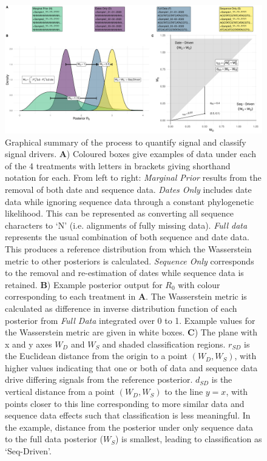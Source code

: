 \documentclass{article}
\begin{document}
\begin{figure}[H]
\centering
\includegraphics[width=1\linewidth]{figures/graphicalMethods.pdf}
\caption{Graphical summary of the process to quantify signal and classify signal drivers.  \textbf{A}) Coloured boxes give examples of data under each of the 4 treatments with letters in brackets giving shorthand notation for each. From left to right: \emph{Marginal Prior} results from the removal of both date and sequence data. \emph{Dates Only} includes date data while ignoring sequence data through a constant phylogenetic likelihood. This can be represented as converting all sequence characters to `N' (i.e. alignments of fully missing data). \emph{Full data} represents the usual combination of both sequence and date data. This produces a reference distribution from which the Wasserstein metric to other posteriors is calculated. \emph{Sequence Only} corresponds to the removal and re-estimation of dates while sequence data is retained. \textbf{B}) Example posterior output for $R_0$ with colour corresponding to each treatment in \textbf{A}. The Wasserstein metric is calculated as difference in inverse distribution function of each posterior from \emph{Full Data} integrated over 0 to 1. Example values for the Wasserstein metric are given in white boxes. \textbf{C}) The plane with x and y axes $W_D$ and $W_S$ and shaded classification regions. $r_{SD}$ is the Euclidean distance from the origin to a point $(W_D, W_S)$, with higher values indicating that one or both of data and sequence data drive differing signals from the reference posterior. $d_{SD}$ is the vertical distance from a point $(W_D, W_S)$ to the line $y=x$, with points closer to this line corresponding to more similar data and sequence data effects such that classification is less meaningful. In the example, distance from the posterior under only sequence data to the full data posterior ($W_S$) is smallest, leading to classification as `Seq-Driven'.}
\label{fig:method}
\end{figure}
\end{document}
